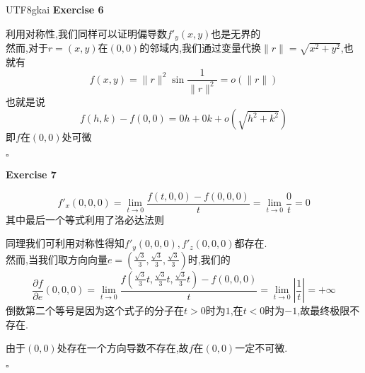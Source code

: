 \documentclass{article}
\newenvironment{exercise}[1]{%
{\textbf{Exercise #1} \\ 
    }
}{
  \hfill $\square$ 
  \par\bigskip 
}
\newcommand{\abs}[1]{\left|#1\right|}
\begin{document}
\begin{CJK}{UTF8}{gkai}
\begin{exercise}{6}
    利用对称性,我们同样可以证明偏导数$f'_y(x,y)$也是无界的\\

    然而,对于$r = (x,y)$在$(0,0)$的邻域内,我们通过变量代换$\|r\| = \sqrt{x^2 + y^2}$,也就有
    \[f(x,y) = \|r\|^2 \sin \frac{1}{\|r\|^2} = o(\|r\|)\]
    也就是说
    \[f(h,k) - f(0,0) = 0 h + 0 k + o(\sqrt{h^2 + k^2})\]
    即$f$在$(0,0)$处可微
\end{exercise}

\begin{exercise}{7}
    \[f'_x(0,0,0) = \lim_{t \to 0} \frac{f(t,0,0) - f(0,0,0)}{t} = \lim_{t \to 0} \frac{0}{t} = 0 \]
    其中最后一个等式利用了洛必达法则

    同理我们可利用对称性得知$f'_y(0,0,0),f'_z(0,0,0)$都存在.\\

    然而,当我们取方向向量$e = (\frac{\sqrt{3}}{3},\frac{\sqrt{3}}{3},\frac{\sqrt{3}}{3})$时,我们的
    \[\frac{\partial f}{\partial e}(0,0,0) = \lim_{t \to 0} \frac{f(\frac{\sqrt{3}}{3}t,\frac{\sqrt{3}}{3}t,\frac{\sqrt{3}}{3}t) - f(0,0,0)}{t} = \lim_{t \to 0} \abs{\frac{1}{t}} = +\infty\]
    倒数第二个等号是因为这个式子的分子在$t > 0$时为$1$,在$t < 0$时为$-1$,故最终极限不存在.

    由于$(0,0)$处存在一个方向导数不存在,故$f$在$(0,0)$一定不可微.

\end{exercise}



\end{CJK}
\end{document}
